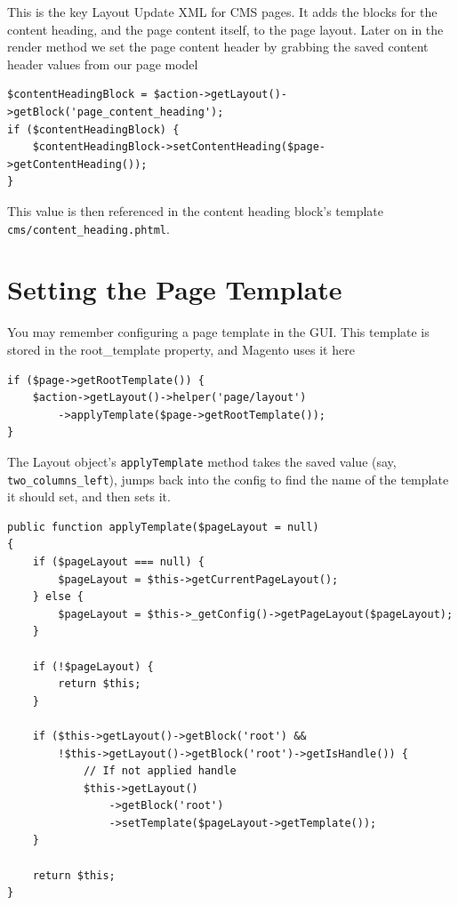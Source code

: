 \documentclass[oneside]{book}
\begin{document}
This is the key Layout Update XML for CMS pages.  It adds the blocks for the content heading, and the page content itself, to the page layout.  Later on in the render method we set the page content header by grabbing the saved content header values from our page model

\begin{lstlisting}
$contentHeadingBlock = $action->getLayout()->getBlock('page_content_heading');
if ($contentHeadingBlock) {
    $contentHeadingBlock->setContentHeading($page->getContentHeading());
}

\end{lstlisting}


This value is then referenced in the content heading block's template \footnotesize\texttt{cms/content\_heading.phtml}\normalsize.

\section{Setting the Page Template}

You may remember configuring a page template in the GUI. This template is stored in the root\_template property, and Magento uses it here

\begin{lstlisting}
if ($page->getRootTemplate()) {
    $action->getLayout()->helper('page/layout')
        ->applyTemplate($page->getRootTemplate());
}

\end{lstlisting}


The Layout object's \footnotesize\texttt{applyTemplate} \normalsize  method takes the saved value (say, \footnotesize\texttt{two\_columns\_left}\normalsize), jumps back into the config to find the name of the template it should set, and then sets it.

\begin{lstlisting}
public function applyTemplate($pageLayout = null)
{
    if ($pageLayout === null) {
        $pageLayout = $this->getCurrentPageLayout();
    } else {
        $pageLayout = $this->_getConfig()->getPageLayout($pageLayout);
    }

    if (!$pageLayout) {
        return $this;
    }

    if ($this->getLayout()->getBlock('root') &&
        !$this->getLayout()->getBlock('root')->getIsHandle()) {
            // If not applied handle
            $this->getLayout()
                ->getBlock('root')
                ->setTemplate($pageLayout->getTemplate());
    }

    return $this;
}

\end{lstlisting}
\end{document}
